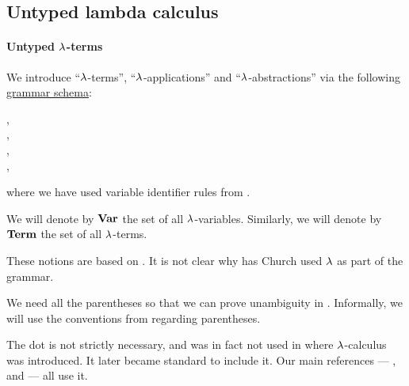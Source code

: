 \subsection{Untyped lambda calculus}\label{subsec:untyped_lambda_calculus}

\paragraph{Untyped \( \synlambda \)-terms}

\begin{definition}\label{def:lambda_term}\mimprovised
  We introduce \enquote{\( \synlambda \)-terms}, \enquote{\( \synlambda \)-applications} and \enquote{\( \synlambda \)-abstractions} via the following \hyperref[def:formal_grammar/schema]{grammar schema}:
  \begin{bnf*}
        {}, \\
     {\bnftsq{\( ( \)} \bnfsp {} \bnfsp {} \bnfsp \bnftsq{\( ) \)}}, \\
     {\bnftsq{\( ( \)} \bnfsp \bnftsq{\( \synlambda \)} \bnfsp {} \bnfsp {} \bnfsp {} \bnfsp \bnftsq{\( ) \)}}, \\
            { \bnfor {} \bnfor {}},
  \end{bnf*}
  where we have used variable identifier rules from .

  \begin{thmenum}
     We will denote by \( \op*{Var} \) the set of all \( \synlambda \)-variables.
     Similarly, we will denote by \( \op*{Term} \) the set of all \( \synlambda \)-terms.
  \end{thmenum}
\end{definition}
\begin{comments}
  \item These notions are based on \cite[352]{Church1932Untyped}. It is not clear why has Church used \( \synlambda \) as part of the grammar.

  \item We need all the parentheses so that we can prove unambiguity in . Informally, we will use the conventions from  regarding parentheses.

  \item The dot is not strictly necessary, and was in fact not used in  where \( \synlambda \)-calculus was introduced. It later became standard to include it. Our main references --- ,  and  --- all use it.
\end{comments}

